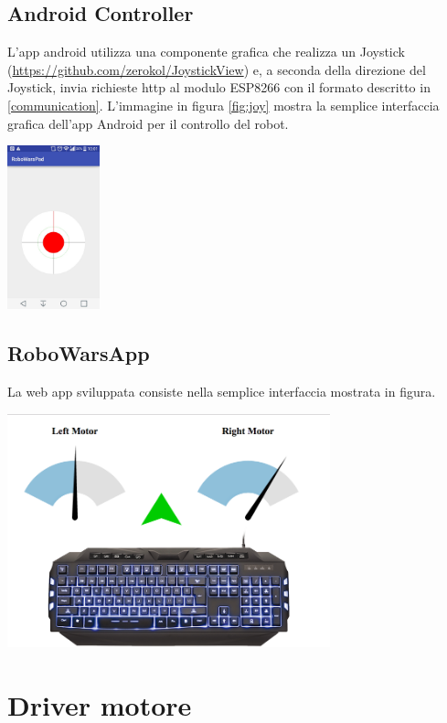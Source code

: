 \documentclass [11pt ,a4paper]{report}
\begin{document}
\subsection{Android Controller}
L'app android utilizza una componente grafica che realizza un Joystick (\url{https://github.com/zerokol/JoystickView}) e, a seconda della direzione del Joystick, invia richieste http al modulo ESP8266 con il formato descritto in \ref{communication}. L'immagine in figura \ref{fig:joy} mostra la semplice interfaccia grafica dell'app Android per il controllo del robot.\\
\begin{center}
\includegraphics[width=0.2\textwidth]{Images/joy.jpg}
\end{center}
\newpage

\subsection{RoboWarsApp}
La web app sviluppata consiste nella semplice interfaccia mostrata in figura.

\begin{center}
\includegraphics[width=0.7\textwidth]{Images/robowarsapp.png}
\end{center}

\section{Driver motore}
\end{document}
